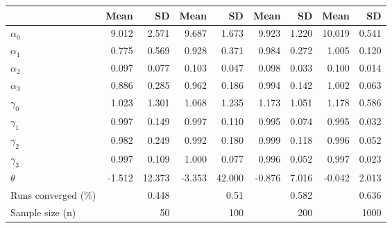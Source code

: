 
\begin{tabular}[t]{lrrrrrrrr}
\toprule
  & Mean & SD & Mean  & SD  & Mean   & SD   & Mean    & SD   \\
\midrule
$\alpha_{0}$ & 9.012 & 2.571 & 9.687 & 1.673 & 9.923 & 1.220 & 10.019 & 0.541\\
$\alpha_{1}$ & 0.775 & 0.569 & 0.928 & 0.371 & 0.984 & 0.272 & 1.005 & 0.120\\
$\alpha_{2}$ & 0.097 & 0.077 & 0.103 & 0.047 & 0.098 & 0.033 & 0.100 & 0.014\\
$\alpha_{3}$ & 0.886 & 0.285 & 0.962 & 0.186 & 0.994 & 0.142 & 1.002 & 0.063\\
$\gamma_{0}$ & 1.023 & 1.301 & 1.068 & 1.235 & 1.173 & 1.051 & 1.178 & 0.586\\
$\gamma_{1}$ & 0.997 & 0.149 & 0.997 & 0.110 & 0.995 & 0.074 & 0.995 & 0.032\\
$\gamma_{2}$ & 0.982 & 0.249 & 0.992 & 0.180 & 0.999 & 0.118 & 0.996 & 0.052\\
$\gamma_{3}$ & 0.997 & 0.109 & 1.000 & 0.077 & 0.996 & 0.052 & 0.997 & 0.023\\
$\theta$ & -1.512 & 12.373 & -3.353 & 42.000 & -0.876 & 7.016 & -0.042 & 2.013\\
Runs converged (\%) &  & 0.448 &  & 0.51 &  & 0.582 &  & 0.636\\
Sample size (n) &  & 50 &  & 100 &  & 200 &  & 1000\\
\bottomrule
\end{tabular}
